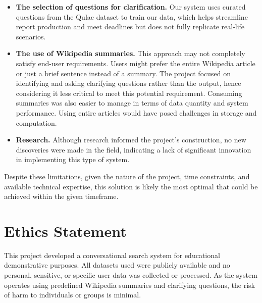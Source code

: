 \documentclass[11pt]{article}
\begin{document}
\begin{itemize}
    \item \textbf{The selection of questions for clarification.} Our system uses curated questions from the Qulac dataset to train our data, which helps streamline report production and meet deadlines but does not fully replicate real-life scenarios.
    
    \item \textbf{The use of Wikipedia summaries.} This approach may not completely satisfy end-user requirements. Users might prefer the entire Wikipedia article or just a brief sentence instead of a summary. The project focused on identifying and asking clarifying questions rather than the output, hence considering it less critical to meet this potential requirement. Consuming summaries was also easier to manage in terms of data quantity and system performance. Using entire articles would have posed challenges in storage and computation.
    
    \item \textbf{Research.} Although research informed the project's construction, no new discoveries were made in the field, indicating a lack of significant innovation in implementing this type of system.
\end{itemize}

Despite these limitations, given the nature of the project, time constraints, and available technical expertise, this solution is likely the most optimal that could be achieved within the given timeframe.


\section*{Ethics Statement}
This project developed a conversational search system for educational demonstrative purposes. All datasets used were publicly available and no personal, sensitive, or specific user data was collected or processed. As the system operates using predefined Wikipedia summaries and clarifying questions, the risk of harm to individuals or groups is minimal. 




\end{document}
